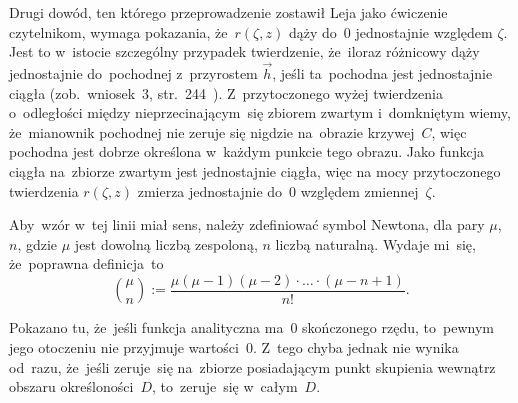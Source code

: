 \documentclass[a4paper,11pt]{article}
\begin{document}
Drugi dowód, ten którego przeprowadzenie zostawił Leja jako ćwiczenie
czytelnikom, wymaga pokazania, że~$r( \zeta, z )$ dąży do~$0$
jednostajnie względem $\zeta$. Jest to w~istocie szczególny przypadek
twierdzenie, że~iloraz różnicowy dąży jednostajnie do~pochodnej
z~przyrostem $\vec{ h }$, jeśli ta~pochodna jest jednostajnie ciągła
(zob.~wniosek~3,
str.~244~\cite{SchwartzKursAnalizyMatematycznejVolI1979}).
Z~przytoczonego wyżej twierdzenia o~odległości między
nieprzecinającym~się zbiorem zwartym i~domkniętym wiemy, że~mianownik
pochodnej nie zeruje się nigdzie na~obrazie krzywej~$C$, więc pochodna
jest dobrze określona w~każdym punkcie tego obrazu. Jako funkcja
ciągła na~zbiorze zwartym jest jednostajnie ciągła, więc na mocy
przytoczonego twierdzenia $r( \zeta, z )$ zmierza jednostajnie do~$0$
względem zmiennej~$\zeta$.

\vspace{\spaceFour}



\start {} Aby~wzór w~tej linii miał sens, należy
zdefiniować symbol Newtona, dla pary $\mu$, $n$, gdzie $\mu$ jest
dowolną liczbą zespoloną, $n$ liczbą naturalną. Wydaje mi~się,
że~poprawna definicja~to
\begin{equation}
  \label{eq:Leja-43}
  \binom{ \mu }{ n } :=
  \frac{ \mu ( \mu - 1 ) ( \mu - 2 ) \cdot \ldots \cdot ( \mu - n + 1 ) }{ n! }.
\end{equation}

\vspace{\spaceFour}



\start {} Pokazano tu, że~jeśli funkcja analityczna ma~0
skończonego rzędu, to~pewnym jego otoczeniu nie przyjmuje wartości~0.
Z~tego chyba jednak nie wynika od~razu, że~jeśli zeruje~się na~zbiorze
posiadającym punkt skupienia wewnątrz obszaru określoności~$D$,
to~zeruje~się w~całym~$D$.
\end{document}
